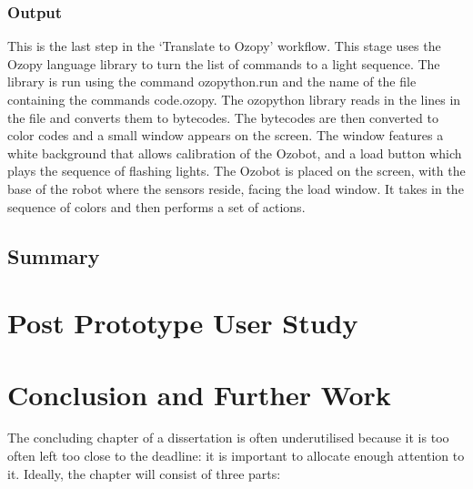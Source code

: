 \documentclass[oneside,%
                    author={Malak Hajji},
                    degree={BSc},
                    title={Designing An Accessible Computational Toolkit For Students},
                  subtitle={With Mixed Visual Abilities}]{dissertation}
\begin{document}
\subsection{Output}  
This is the last step in the ‘Translate to Ozopy’ workflow. This stage uses the Ozopy language library to turn the list of commands to a light sequence. The library is run using the command ozopython.run and the name of the file containing the commands code.ozopy. The ozopython library reads in the lines in the file and converts them to bytecodes. The bytecodes are then converted to color codes and a small window appears on the screen. The window features a white background that allows calibration of the Ozobot, and a load button which plays the sequence of flashing lights. The Ozobot is placed on the screen, with the base of the robot where the sensors reside, facing the load window. It takes in the sequence of colors and then performs a set of actions. 

\section{Summary}









\chapter{Post Prototype User Study}


\chapter{Conclusion and Further Work}
\label{chap:conclusion}

\noindent
The concluding chapter of a dissertation is often underutilised because it 
is too often left too close to the deadline: it is important to allocate
enough attention to it.  Ideally, the chapter will consist of three parts:
\end{document}
